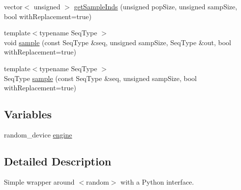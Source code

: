 \begin{DoxyCompactItemize}
\item 
vector$<$ unsigned $>$ \hyperlink{namespacekrandom_aa1ecb85e031f5505020d74732acd846a}{get\-Sample\-Inds} (unsigned pop\-Size, unsigned samp\-Size, bool with\-Replacement=true)
\item 
{\footnotesize template$<$typename Seq\-Type $>$ }\\void \hyperlink{namespacekrandom_a924f7dd5ed9785fd396615b9995e47da}{sample} (const Seq\-Type \&seq, unsigned samp\-Size, Seq\-Type \&out, bool with\-Replacement=true)
\item 
{\footnotesize template$<$typename Seq\-Type $>$ }\\Seq\-Type \hyperlink{namespacekrandom_a59cee8cdbf9ac39cc5d3762935dbdfb7}{sample} (const Seq\-Type \&seq, unsigned samp\-Size, bool with\-Replacement=true)
\end{DoxyCompactItemize}
\subsection*{Variables}
\begin{DoxyCompactItemize}
\item 
random\-\_\-device \hyperlink{namespacekrandom_a5c40b80390a0425475af691519056f21}{engine}
\end{DoxyCompactItemize}


\subsection{Detailed Description}
Simple wrapper around {\ttfamily $<$random$>$} with a Python interface. 

